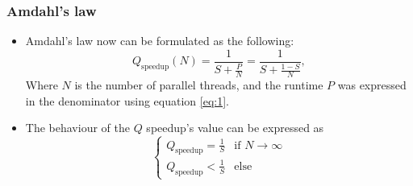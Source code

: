 \begin{frame}
\frametitle{Amdahl's law}

\begin{itemize}
	\item<1-> Amdahl's law now can be formulated as the following:
	\begin{equation} \label{eq:2}
		Q_{\text{speedup}} \left( N \right)
		=
		\frac{1}{S + \frac{P}{N}}
		=
		\frac{1}{S + \frac{1 - S}{N}},
	\end{equation}
	Where $N$ is the number of parallel threads, and the runtime $P$ was expressed in the denominator using equation \eqref{eq:1}.
	\item<2-> The behaviour of the $Q$ speedup's value can be expressed as
	\begin{equation}
		\begin{cases}
			Q_{\text{speedup}} = \frac{1}{S} & \text{if } N \to \infty \\
			Q_{\text{speedup}} < \frac{1}{S} & \text{else}
		\end{cases}
	\end{equation}
\end{itemize}

\end{frame}